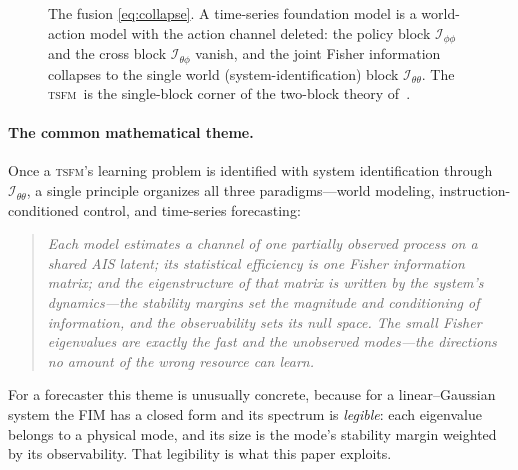 \documentclass[10pt]{article}
\theoremstyle{plain}
\theoremstyle{definition}
\theoremstyle{remark}
\newcommand{\Fisher}{\mathcal{I}}
\newcommand{\Ith}{\Fisher_{\theta\theta}}
\newcommand{\Iph}{\Fisher_{\phi\phi}}
\newcommand{\Itp}{\Fisher_{\theta\phi}}
\newcommand{\given}{\,\vert\,}
\newcommand{\wm}{P_{\theta}}
\newcommand{\TSFM}{\textsc{tsfm}}
\newcommand{\WAM}{\textsc{wam}}
\newcommand{\VLA}{\textsc{vla}}
\begin{document}
\begin{figure}[t]
\centering
{}
\caption{The fusion \eqref{eq:collapse}. A time-series foundation model is a
world-action model with the action channel deleted: the policy block $\Iph$ and
the cross block $\Itp$ vanish, and the joint Fisher information collapses to the
single world (system-identification) block $\Ith$. The \TSFM\ is the
single-block corner of the two-block theory of~\cite{wamvla}.}
\label{fig:collapse}
\end{figure}

\paragraph{The common mathematical theme.}
Once a \TSFM's learning problem is identified with system identification through
$\Ith$, a single principle organizes all three paradigms---world modeling,
instruction-conditioned control, and time-series forecasting:
\begin{quote}\itshape
Each model estimates a channel of one partially observed process on a shared
AIS latent; its statistical efficiency is one Fisher information matrix; and the
eigenstructure of that matrix is written by the system's \emph{dynamics}---the
stability margins set the \emph{magnitude and conditioning} of information, and
the observability sets its \emph{null space}. The small Fisher eigenvalues are
exactly the fast and the unobserved modes---the directions no amount of the
wrong resource can learn.
\end{quote}
For a forecaster this theme is unusually concrete, because for a
linear--Gaussian system the FIM has a closed form and its spectrum is
\emph{legible}: each eigenvalue belongs to a physical mode, and its size is the
mode's stability margin weighted by its observability. That legibility is what
this paper exploits.
\end{document}
